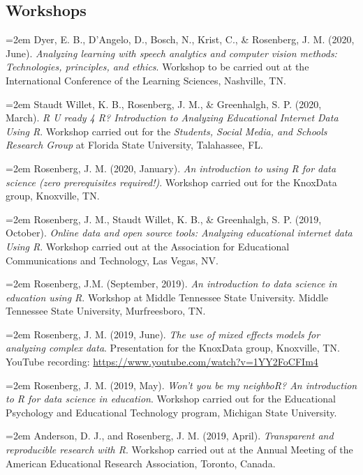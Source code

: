 \documentclass[
  14,
]{article}
\begin{document}
\hypertarget{workshops}{%
\subsection{Workshops}\label{workshops}}

\hangindent=2em Dyer, E. B., D'Angelo, D., Bosch, N., Krist, C., \&
Rosenberg, J. M. (2020, June). \emph{Analyzing learning with speech
analytics and computer vision methods: Technologies, principles, and
ethics}. Workshop to be carried out at the International Conference of
the Learning Sciences, Nashville, TN.

\hangindent=2em Staudt Willet, K. B., Rosenberg, J. M., \& Greenhalgh,
S. P. (2020, March). \emph{R U ready 4 R? Introduction to Analyzing
Educational Internet Data Using R}. Workshop carried out for the
\emph{Students, Social Media, and Schools Research Group} at Florida
State University, Talahassee, FL.

\hangindent=2em Rosenberg, J. M. (2020, January). \emph{An introduction
to using R for data science (zero prerequisites required!)}. Workshop
carried out for the KnoxData group, Knoxville, TN.

\hangindent=2em Rosenberg, J. M., Staudt Willet, K. B., \& Greenhalgh,
S. P. (2019, October). \emph{Online data and open source tools:
Analyzing educational internet data Using R}. Workshop carried out at
the Association for Educational Communications and Technology, Las
Vegas, NV.

\hangindent=2em Rosenberg, J.M. (September, 2019). \emph{An introduction
to data science in education using R}. Workshop at Middle Tennessee
State University. Middle Tennessee State University, Murfreesboro, TN.

\hangindent=2em Rosenberg, J. M. (2019, June). \emph{The use of mixed
effects models for analyzing complex data}. Presentation for the
KnoxData group, Knoxville, TN. YouTube recording:
\url{https://www.youtube.com/watch?v=1YY2FoCFIm4}

\hangindent=2em Rosenberg, J. M. (2019, May). \emph{Won't you be my
neighboR? An introduction to R for data science in education}. Workshop
carried out for the Educational Psychology and Educational Technology
program, Michigan State University.

\hangindent=2em Anderson, D. J., and Rosenberg, J. M. (2019, April).
\emph{Transparent and reproducible research with R}. Workshop carried
out at the Annual Meeting of the American Educational Research
Association, Toronto, Canada.
\end{document}
